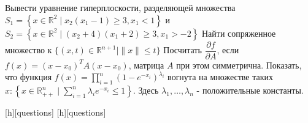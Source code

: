 \documentclass[12pt,addpoints]{exam}
\begin{document}
\begin{questions}
	
	\question[6] Вывести уравнение гиперплоскости, разделяющей множества\\ $S_1 = \left\{ x \in \mathbb{R}^2 \mid x_2(x_1 - 1) \ge 3, x_1 < 1 \right\}$ и $S_2 = \left\{ x \in \mathbb{R}^2 \mid (x_2+4)(x_1+2) \ge 3, x_1 > -2 \right\}$
	\question[6] Найти сопряженное множество к $\{ (x, t) \in \mathbb{R}^{n+1} \mid \| x \| \leq t \}$
	\question[6] Посчитать $\dfrac{\partial f}{\partial A}$, если $f(x) = (x - x_0)^T A (x - x_0)$, матрица $A$ при этом симметрична.
	\question[7] Показать, что функция $f(x) = \prod\limits_{i=1}^n (1 - e^{-x_i})^{\lambda_i}$ вогнута на множестве таких $x: \left\{ x \in \mathbb{R}^n_{++} \mid \sum\limits_{i=1}^n \lambda_i e^{-x_i} \le 1 \right\}$. Здесь $\lambda_1, \ldots, \lambda_n$ - положительные константы.
	
	\begin{center}
		\vfill
		\tiny
		[h][questions]
		\vfill
		[h][questions]
	\end{center}
\end{questions}
\end{document}
